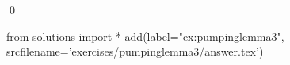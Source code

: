 
\begin{ex} 
  \label{ex:pumpinglemma3}
  
  \qed
\end{ex} 
\begin{python0}
from solutions import *
add(label="ex:pumpinglemma3",
    srcfilename='exercises/pumpinglemma3/answer.tex') 
\end{python0}
